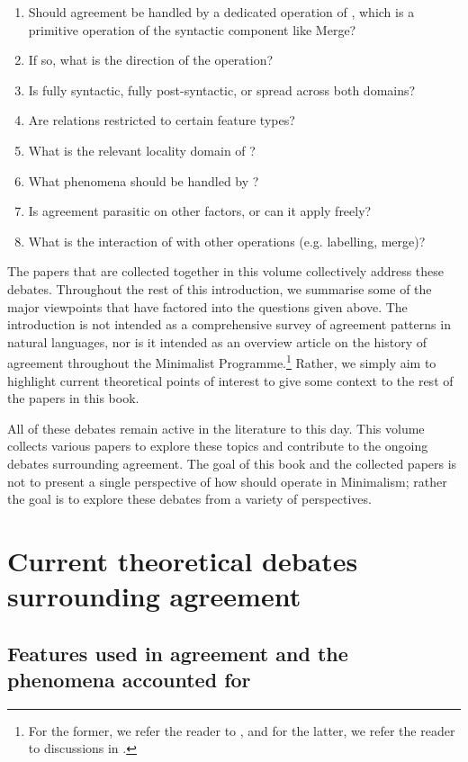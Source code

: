 \documentclass[output=paper
,modfonts
,nonflat]{langsci/langscibook}
\begin{document}
\begin{enumerate}\itemsep0pt
	\item Should agreement be handled by a dedicated operation of \agr, which is a primitive operation of the syntactic component like Merge?
	\item If so, what is the direction of the \agr{} operation?
	\item Is \agr{} fully syntactic, fully post-syntactic, or spread across both domains?
	\item Are \agr{} relations restricted to certain feature types?
	\item What is the relevant locality domain of \agr?
	\item What phenomena should be handled by \agr?
	\item Is agreement parasitic on other factors, or can it apply freely?
	\item What is the interaction of \agr{} with other operations (e.g. labelling, merge)?
\end{enumerate}
The papers that are collected together in this volume collectively address these debates. Throughout the rest of this introduction, we summarise some of the major viewpoints that have factored into the questions given above.
The introduction is not intended as a comprehensive survey of agreement patterns in natural languages, nor is it intended as an overview article on the history of agreement throughout the Minimalist Programme.\footnote{For the former, we refer the reader to \citet{corbett2006}, and for the latter, we refer the reader to discussions in \citet{Fuss2005,baker2008,Miyagawa2010,preminger2015}.}
Rather, we simply aim to highlight current theoretical points of interest to give some context to the rest of the papers in this book.

All of these debates remain active in the literature to this day.
This volume collects various papers to explore these topics and contribute to the ongoing debates surrounding agreement.
The goal of this book and the collected papers is not to present a single perspective of how \agr{} should operate in Minimalism; rather the goal is to explore these debates from a variety of perspectives.

\section{Current theoretical debates surrounding agreement}
\label{seccurrentdebates}

\subsection{Features used in agreement and the phenomena accounted for}
\label{secfeatures}
 
\end{document}
